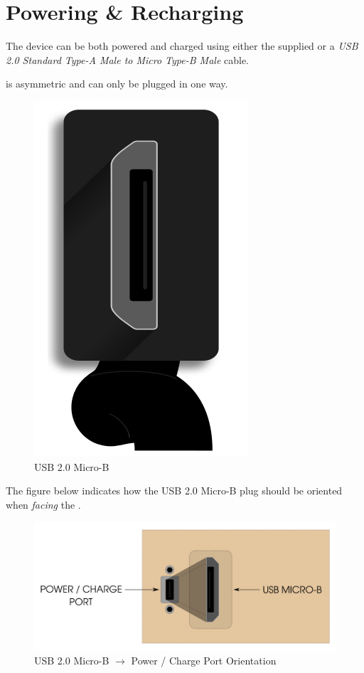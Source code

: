 \chapter{Powering \& Recharging} \label{Powering and Recharging}

The device can be both powered and charged using either the supplied
\hyperref[Power Adapter]{} or a \textit{USB 2.0 Standard Type-A Male to
Micro Type-B Male} cable.

\par\medskip

 is asymmetric and can only be plugged in one way.

\begin{figure}[H]
\centering
  \includegraphics{images/usb.png}
\caption{USB 2.0 Micro-B}
\end{figure}

The figure below indicates how the USB 2.0 Micro-B plug should be oriented when
\textit{facing} the \hyperref[Power Port]{}.

\begin{figure}[H]
\centering
  \includegraphics{images/usb_orientation.png}
\caption{USB 2.0 Micro-B $\longrightarrow$ Power / Charge Port Orientation}
\end{figure}

